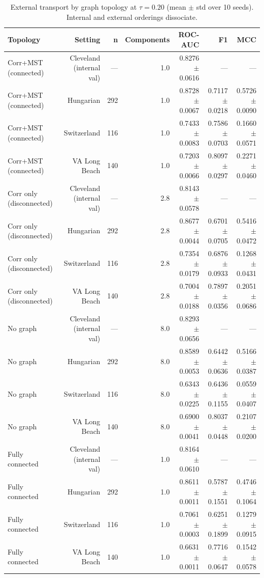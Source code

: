 \begin{table}[t]
\centering
\caption{External transport by graph topology at $\tau=0.20$ (mean $\pm$ std over 10 seeds). Internal and external orderings dissociate.}
\label{tab:msttransport}
\footnotesize
\begin{tabular}{lrrrrrr}
\toprule
Topology & Setting & n & Components & ROC-AUC & F1 & MCC \\
\midrule
Corr+MST (connected) & Cleveland (internal val) & --- & 1.0 & 0.8276 $\pm$ 0.0616 & --- & --- \\
Corr+MST (connected) & Hungarian & 292 & 1.0 & 0.8728 $\pm$ 0.0067 & 0.7117 $\pm$ 0.0218 & 0.5726 $\pm$ 0.0090 \\
Corr+MST (connected) & Switzerland & 116 & 1.0 & 0.7433 $\pm$ 0.0083 & 0.7586 $\pm$ 0.0703 & 0.1660 $\pm$ 0.0571 \\
Corr+MST (connected) & VA Long Beach & 140 & 1.0 & 0.7203 $\pm$ 0.0066 & 0.8097 $\pm$ 0.0297 & 0.2271 $\pm$ 0.0460 \\
Corr only (disconnected) & Cleveland (internal val) & --- & 2.8 & 0.8143 $\pm$ 0.0578 & --- & --- \\
Corr only (disconnected) & Hungarian & 292 & 2.8 & 0.8677 $\pm$ 0.0044 & 0.6701 $\pm$ 0.0705 & 0.5416 $\pm$ 0.0472 \\
Corr only (disconnected) & Switzerland & 116 & 2.8 & 0.7354 $\pm$ 0.0179 & 0.6876 $\pm$ 0.0933 & 0.1268 $\pm$ 0.0431 \\
Corr only (disconnected) & VA Long Beach & 140 & 2.8 & 0.7004 $\pm$ 0.0188 & 0.7897 $\pm$ 0.0356 & 0.2051 $\pm$ 0.0686 \\
No graph & Cleveland (internal val) & --- & 8.0 & 0.8293 $\pm$ 0.0656 & --- & --- \\
No graph & Hungarian & 292 & 8.0 & 0.8589 $\pm$ 0.0053 & 0.6442 $\pm$ 0.0636 & 0.5166 $\pm$ 0.0387 \\
No graph & Switzerland & 116 & 8.0 & 0.6343 $\pm$ 0.0225 & 0.6436 $\pm$ 0.1155 & 0.0559 $\pm$ 0.0407 \\
No graph & VA Long Beach & 140 & 8.0 & 0.6900 $\pm$ 0.0041 & 0.8037 $\pm$ 0.0448 & 0.2107 $\pm$ 0.0200 \\
Fully connected & Cleveland (internal val) & --- & 1.0 & 0.8164 $\pm$ 0.0610 & --- & --- \\
Fully connected & Hungarian & 292 & 1.0 & 0.8611 $\pm$ 0.0011 & 0.5787 $\pm$ 0.1551 & 0.4746 $\pm$ 0.1064 \\
Fully connected & Switzerland & 116 & 1.0 & 0.7061 $\pm$ 0.0003 & 0.6251 $\pm$ 0.1899 & 0.1279 $\pm$ 0.0915 \\
Fully connected & VA Long Beach & 140 & 1.0 & 0.6631 $\pm$ 0.0011 & 0.7716 $\pm$ 0.0647 & 0.1542 $\pm$ 0.0578 \\
\bottomrule
\end{tabular}
\end{table}
